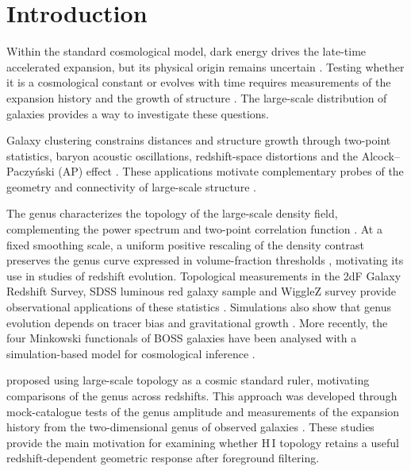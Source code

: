 \section{Introduction}\label{sec:intro}
Within the standard cosmological model, dark energy drives the late-time accelerated expansion, but its physical origin remains uncertain \citep{PeeblesRatra2003DarkEnergy,Li2011DarkEnergy}. Testing whether it is a cosmological constant or evolves with time requires measurements of the expansion history and the growth of structure \citep{Weinberg2013Acceleration}. The large-scale distribution of galaxies provides a way to investigate these questions.

Galaxy clustering constrains distances and structure growth through two-point statistics, baryon acoustic oscillations, redshift-space distortions and the Alcock--Paczy\'nski (AP) effect \citep{Tegmark2004SDSS,BlakeGlazebrook2003BAO,SeoEisenstein2003BAO,Eisenstein2005BAO,Kaiser1987,Ballinger1996AP,Alam2017BOSS}. These applications motivate complementary probes of the geometry and connectivity of large-scale structure \citep{Blake2011Growth,Blake2011AP,Beutler2017Anisotropic}.

The genus characterizes the topology of the large-scale density field, complementing the power spectrum and two-point correlation function \citep{Hamilton1986Topology,Mecke1994,SchmalzingBuchert1997Morphology}. At a fixed smoothing scale, a uniform positive rescaling of the density contrast preserves the genus curve expressed in volume-fraction thresholds \citep{Matsubara2003SmoothedFields,Wang2012TopologyGravity}, motivating its use in studies of redshift evolution. Topological measurements in the 2dF Galaxy Redshift Survey, SDSS luminous red galaxy sample and WiggleZ survey provide observational applications of these statistics \citep{Park2005SDSS,James2009Topology2dF,Gott2009LRGGenus,Blake2014WiggleZTopology}. Simulations also show that genus evolution depends on tracer bias and gravitational growth \citep{Park2005Evolution}. More recently, the four Minkowski functionals of BOSS galaxies have been analysed with a simulation-based model for cosmological inference \citep{Liu2025}.

\citet{ParkKim2010Ruler} proposed using large-scale topology as a cosmic standard ruler, motivating comparisons of the genus across redshifts. This approach was developed through mock-catalogue tests of the genus amplitude \citep{Appleby2018} and measurements of the expansion history from the two-dimensional genus of observed galaxies \citep{Appleby2021GenusExpansion}. These studies provide the main motivation for examining whether H\,I topology retains a useful redshift-dependent geometric response after foreground filtering.

